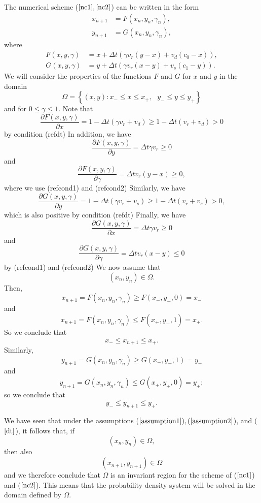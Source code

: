 The numerical scheme ($\ref{nc1}, \ref{nc2}$) can be written in the form
\begin{align*}
x_{n+1}  &  =F(x_{n},y_{n},\gamma_{n}),\\
y_{n+1}  &  =G(x_{n},y_{n},\gamma_{n}),
\end{align*}
where
\begin{align*}
F(x,y,\gamma) &  =x+\Delta t\left(  \gamma v_{r}\left(  y-x\right)
+v_{d}\left(  c_{0}-x\right)  \right),  \\
G(x,y,\gamma) &  =y+\Delta t\left(  \gamma v_{r}\left(  x-y\right)
+v_{s}\left(  c_{1}-y\right)  \right).
\end{align*}
We will consider the properties of the functions $F$ and $G$ for $x$ and $y$
in the domain
\begin{equation}
\Omega=\left\{  (x,y):x_{-}\leq x\leq x_{+},\text{ }y_{-}\leq y\leq
y_{+}\right\}  \label{cond2}
\end{equation}
and for $0\leq\gamma\leq1.$ Note that
\[
\frac{\partial F(x,y,\gamma)}{\partial x}=1-\Delta t\left(  \gamma v_{r}
+v_{d}\right)  \geq1-\Delta t\left(  v_{r}+v_{d}\right)  >0
\]
by condition (ref{dt}) In addition, we have
\[
\frac{\partial F(x,y,\gamma)}{\partial y}=\Delta t\gamma v_{r}\geq0
\]
and
\[
\frac{\partial F(x,y,\gamma)}{\partial\gamma}=\Delta tv_{r}\left(  y-x\right)
\geq0,
\]
where we use (ref{cond1}) and (ref{cond2}) Similarly, we
have
\[
\frac{\partial G(x,y,\gamma)}{\partial y}=1-\Delta t\left(  \gamma
v_{r}+v_{s}\right)  \geq1-\Delta t\left(  v_{r}+v_{s}\right)  >0,
\]
which is also positive by condition (ref{dt}) Finally,
we have
\[
\frac{\partial G(x,y,\gamma)}{\partial x}=\Delta t\gamma v_{r}\geq0
\]
and
\[
\frac{\partial G(x,y,\gamma)}{\partial\gamma}=\Delta t v_{r}\left(
x-y\right)  \leq0
\]
by (ref{cond1}) and (ref{cond2}) We now assume that
\[
(x_{n},y_{n})\in\Omega.
\]
Then,
\[
x_{n+1}=F(x_{n},y_{n},\gamma_{n})\geq F(x_{-},y_{-},0)=x_{-}
\]
and
\[
x_{n+1}=F(x_{n},y_{n},\gamma_{n})\leq F(x_{+},y_{+},1)=x_{+}.
\]
So we conclude that
\[
x_{-}\leq x_{n+1}\leq x_{+}.
\]
Similarly,
\[
y_{n+1}=G(x_{n},y_{n},\gamma_{n})\geq G(x_{-},y_{-},1)=y_{-}
\]
and
\[
y_{n+1}=G(x_{n},y_{n},\gamma_{n})\leq G(x_{+},y_{+},0)=y_{+};
\]
so we conclude that
\[
y_{-}\leq y_{n+1}\leq y_{+}.
\]

We have seen that under the assumptions ($\ref{assumption1}), (\ref{assumption2}$), and ($\ref{dt}$), it follows that, if
\bigskip
\[
(x_{n},y_{n})\in\Omega,
\]
then also
\[
(x_{n+1},y_{n+1})\in\Omega
\]
and we therefore conclude that $\Omega$ is an invariant region for the scheme of
($\ref{nc1}$) and ($\ref{nc2}$). This means that the probability density system will be solved in the
domain defined by $\Omega.$

